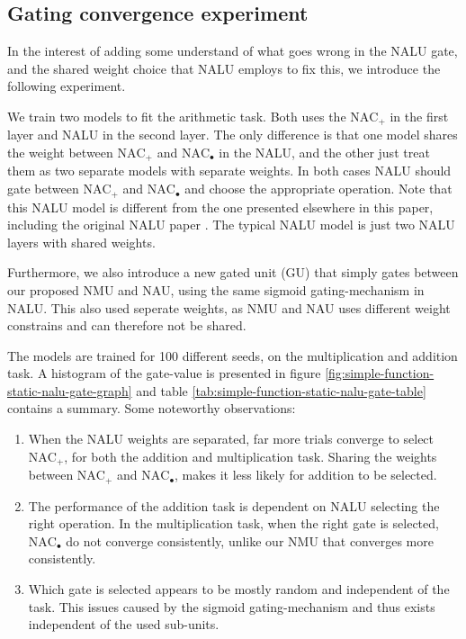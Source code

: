 \subsection{Gating convergence experiment}
\label{sec:appendix:nalu-gate-experiment}

In the interest of adding some understand of what goes wrong in the NALU gate, and the shared weight choice that NALU employs to fix this, we introduce the following experiment.

We train two models to fit the arithmetic task. Both uses the $\mathrm{NAC}_{+}$ in the first layer and NALU in the second layer. The only difference is that one model shares the weight between $\mathrm{NAC}_{+}$ and $\mathrm{NAC}_{\bullet}$ in the NALU, and the other just treat them as two separate models with separate weights. In both cases NALU should gate between $\mathrm{NAC}_{+}$ and $\mathrm{NAC}_{\bullet}$ and choose the appropriate operation. Note that this NALU model is different from the one presented elsewhere in this paper, including the original NALU paper \cite{trask-nalu}. The typical NALU model is just two NALU layers with shared weights.

Furthermore, we also introduce a new gated unit (GU) that simply gates between our proposed NMU and NAU, using the same sigmoid gating-mechanism in NALU. This also used seperate weights, as NMU and NAU uses different weight constrains and can therefore not be shared.

The models are trained for 100 different seeds, on the multiplication and addition task. A histogram of the gate-value is presented in figure \ref{fig:simple-function-static-nalu-gate-graph} and table \ref{tab:simple-function-static-nalu-gate-table} contains a summary. Some noteworthy observations:

\vspace{-0.3cm}\begin{enumerate}
    \item When the NALU weights are separated, far more trials converge to select $\mathrm{NAC}_{+}$, for both the addition and multiplication task. Sharing the weights between $\mathrm{NAC}_{+}$ and $\mathrm{NAC}_{\bullet}$, makes it less likely for addition to be selected. 
    \item The performance of the addition task is dependent on NALU selecting the right operation. In the multiplication task, when the right gate is selected, $\mathrm{NAC}_{\bullet}$ do not converge consistently, unlike our NMU that converges more consistently.
    \item Which gate is selected appears to be mostly random and independent of the task. This issues caused by the sigmoid gating-mechanism and thus exists independent of the used sub-units.
\end{enumerate}

